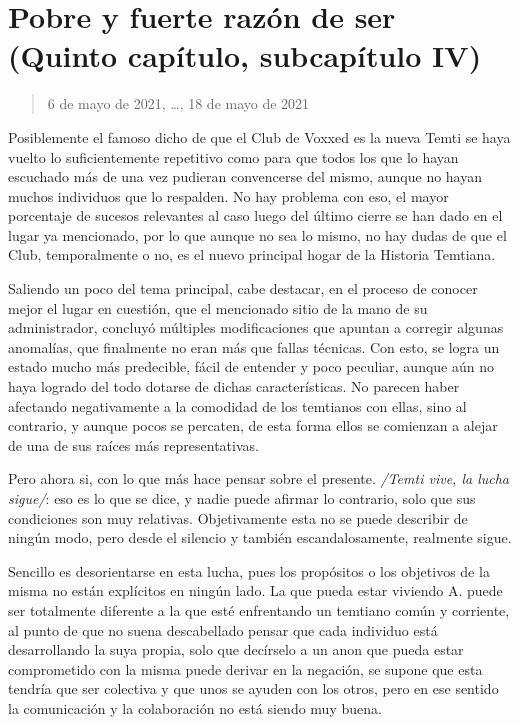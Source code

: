 \documentclass[
  spanish,
]{book}
\begin{document}
\hypertarget{pobre-y-fuerte-razuxf3n-de-ser-quinto-capuxedtulo-subcapuxedtulo-iv}{%
\section{Pobre y fuerte razón de ser (Quinto capítulo, subcapítulo IV)}\label{pobre-y-fuerte-razuxf3n-de-ser-quinto-capuxedtulo-subcapuxedtulo-iv}}

\begin{quote}
6 de mayo de 2021, \ldots, 18 de mayo de 2021
\end{quote}

Posiblemente el famoso dicho de que el Club de Voxxed es la nueva Temti se haya vuelto lo suficientemente repetitivo como para que todos los que lo hayan escuchado más de una vez pudieran convencerse del mismo, aunque no hayan muchos individuos que lo respalden. No hay problema con eso, el mayor porcentaje de sucesos relevantes al caso luego del último cierre se han dado en el lugar ya mencionado, por lo que aunque no sea lo mismo, no hay dudas de que el Club, temporalmente o no, es el nuevo principal hogar de la Historia Temtiana.

Saliendo un poco del tema principal, cabe destacar, en el proceso de conocer mejor el lugar en cuestión, que el mencionado sitio de la mano de su administrador, concluyó múltiples modificaciones que apuntan a corregir algunas anomalías, que finalmente no eran más que fallas técnicas. Con esto, se logra un estado mucho más predecible, fácil de entender y poco peculiar, aunque aún no haya logrado del todo dotarse de dichas características. No parecen haber afectando negativamente a la comodidad de los temtianos con ellas, sino al contrario, y aunque pocos se percaten, de esta forma ellos se comienzan a alejar de una de sus raíces más representativas.

Pero ahora si, con lo que más hace pensar sobre el presente. \emph{/Temti vive, la lucha sigue/}: eso es lo que se dice, y nadie puede afirmar lo contrario, solo que sus condiciones son muy relativas. Objetivamente esta no se puede describir de ningún modo, pero desde el silencio y también escandalosamente, realmente sigue.

Sencillo es desorientarse en esta lucha, pues los propósitos o los objetivos de la misma no están explícitos en ningún lado. La que pueda estar viviendo A. puede ser totalmente diferente a la que esté enfrentando un temtiano común y corriente, al punto de que no suena descabellado pensar que cada individuo está desarrollando la suya propia, solo que decírselo a un anon que pueda estar comprometido con la misma puede derivar en la negación, se supone que esta tendría que ser colectiva y que unos se ayuden con los otros, pero en ese sentido la comunicación y la colaboración no está siendo muy buena.
\end{document}
